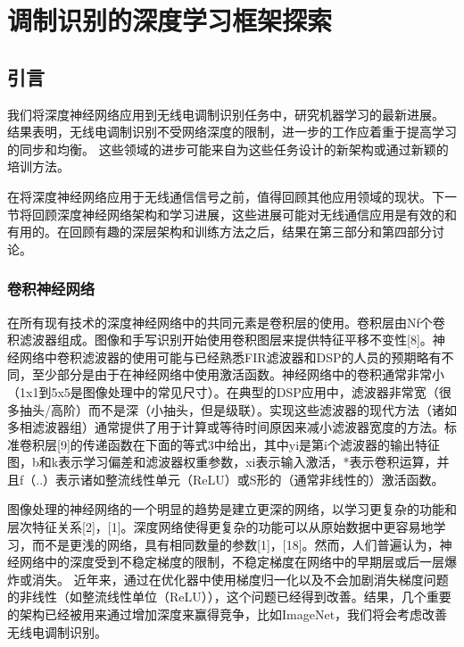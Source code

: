 \chapter{调制识别的深度学习框架探索}
\section{引言}
我们将深度神经网络应用到无线电调制识别任务中，研究机器学习的最新进展。 结果表明，无线电调制识别不受网络深度的限制，进一步的工作应着重于提高学习的同步和均衡。 这些领域的进步可能来自为这些任务设计的新架构或通过新颖的培训方法。\par

在将深度神经网络应用于无线通信信号之前，值得回顾其他应用领域的现状。下一节将回顾深度神经网络架构和学习进展，这些进展可能对无线通信应用是有效的和有用的。在回顾有趣的深层架构和训练方法之后，结果在第三部分和第四部分讨论。 \par

\subsection{卷积神经网络}
在所有现有技术的深度神经网络中的共同元素是卷积层的使用。卷积层由Nf个卷积滤波器组成。图像和手写识别开始使用卷积图层来提供特征平移不变性[8]。神经网络中卷积滤波器的使用可能与已经熟悉FIR滤波器和DSP的人员的预期略有不同，至少部分是由于在神经网络中使用激活函数。神经网络中的卷积通常非常小（1x1到5x5是图像处理中的常见尺寸）。在典型的DSP应用中，滤波器非常宽（很多抽头/高阶）而不是深（小抽头，但是级联）。实现这些滤波器的现代方法（诸如多相滤波器组）通常提供了用于计算或等待时间原因来减小滤波器宽度的方法。标准卷积层[9]的传递函数在下面的等式3中给出，其中yi是第i个滤波器的输出特征图，b和k表示学习偏差和滤波器权重参数，xi表示输入激活，*表示卷积运算，并且f（..）表示诸如整流线性单元（ReLU）或S形的（通常非线性的）激活函数。\par

图像处理的神经网络的一个明显的趋势是建立更深的网络，以学习更复杂的功能和层次特征关系[2]，[1]。深度网络使得更复杂的功能可以从原始数据中更容易地学习，而不是更浅的网络，具有相同数量的参数[1]，[18]。然而，人们普遍认为，神经网络中的深度受到不稳定梯度的限制，不稳定梯度在网络中的早期层或后一层爆炸或消失。
近年来，通过在优化器中使用梯度归一化以及不会加剧消失梯度问题的非线性（如整流线性单位（ReLU）），这个问题已经得到改善。结果，几个重要的架构已经被用来通过增加深度来赢得竞争，比如ImageNet，我们将会考虑改善无线电调制识别。\par

